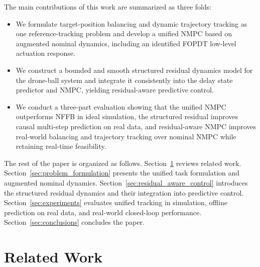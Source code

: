 \documentclass[letterpaper, 10 pt, conference]{ieeeconf}  %
\begin{document}
The main contributions of this work are summarized as three folds:
\begin{itemize}
    \item We formulate target-position balancing and dynamic trajectory tracking as one reference-tracking
    problem and develop a unified NMPC based on augmented nominal dynamics, including an identified FOPDT
    low-level actuation response.
    \item We construct a bounded and smooth structured residual dynamics model for the drone-ball system and
    integrate it consistently into the delay state predictor and NMPC, yielding residual-aware predictive control.
    \item We conduct a three-part evaluation showing that the unified NMPC outperforms NFFB in ideal simulation,
    the structured residual improves causal multi-step prediction on real data, and residual-aware NMPC improves
    real-world balancing and trajectory tracking over nominal NMPC while retaining real-time feasibility.
\end{itemize}

The rest of the paper is organized as follows. Section~\ref{sec:related_work} reviews related work.
Section~\ref{sec:problem_formulation} presents the unified task formulation and augmented nominal dynamics.
Section~\ref{sec:residual_aware_control} introduces the structured residual dynamics and their integration into
predictive control. Section~\ref{sec:experiments} evaluates unified tracking in simulation, offline prediction
on real data, and real-world closed-loop performance. Section~\ref{sec:conclusions} concludes the paper.


\section{Related Work}
\label{sec:related_work}
\end{document}
